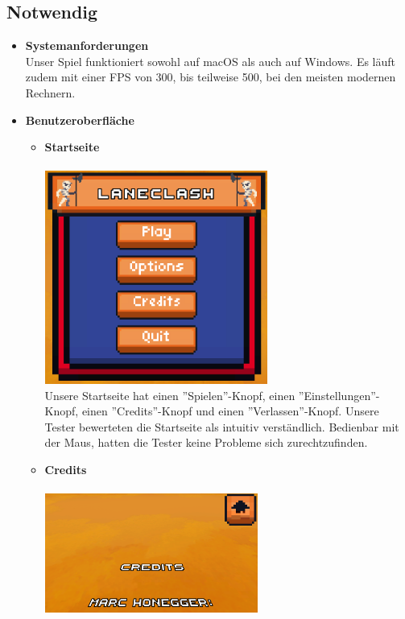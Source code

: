 \subsection{Notwendig}
    \begin{itemize}
    \item \textbf{Systemanforderungen} \\
        Unser Spiel funktioniert sowohl auf macOS als auch auf Windows. Es läuft zudem mit einer FPS von 300, bis teilweise 500, bei den meisten modernen Rechnern.
    \item \textbf{Benutzeroberfläche} \\
    \begin {itemize}
        \item \textbf{Startseite} \\
            \\
            \includegraphics[height=7cm]{resources/laneclash.png}\\
            Unsere Startseite hat einen ''Spielen''-Knopf, einen ''Einstellungen''-Knopf, einen ''Credits''-Knopf und einen ''Verlassen''-Knopf. Unsere Tester bewerteten die Startseite
            als intuitiv verständlich. Bedienbar mit der Maus, hatten die Tester keine Probleme sich zurechtzufinden.
        \item \textbf{Credits}\\
            \\
            \includegraphics*[width = 7cm]{resources/credits.png}\\

\end{itemize}
\end{itemize}
